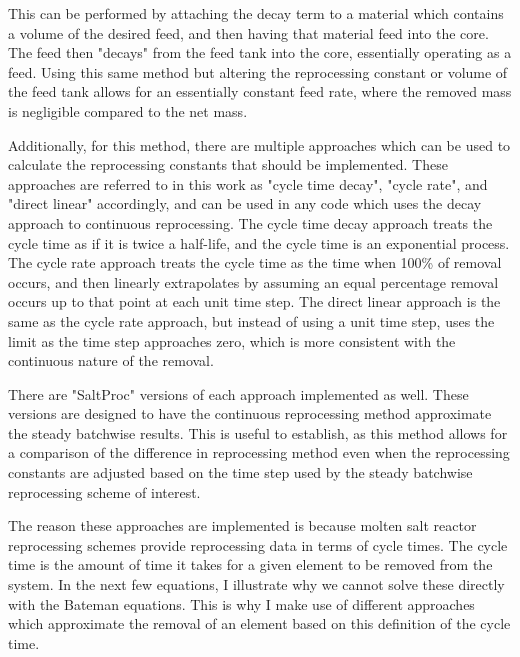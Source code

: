 This can be performed by attaching the decay term to a material which contains a volume of the desired feed, and then having that material feed into the core. The feed then "decays" from the feed tank into the core, essentially operating as a feed. Using this same method but altering the reprocessing constant or volume of the feed tank allows for an essentially constant feed rate, where the removed mass is negligible compared to the net mass.

Additionally, for this method, there are multiple approaches which can be used to calculate the reprocessing constants that should be implemented. These approaches are referred to in this work as "cycle time decay", "cycle rate", and "direct linear" accordingly, and can be used in any code which uses the decay approach to continuous reprocessing. The cycle time decay approach treats the cycle time as if it is twice a half-life, and the cycle time is an exponential process. The cycle rate approach treats the cycle time as the time when 100\% of removal occurs, and then linearly extrapolates by assuming an equal percentage removal occurs up to that point at each unit time step. The direct linear approach is the same as the cycle rate approach, but instead of using a unit time step, uses the limit as the time step approaches zero, which is more consistent with the continuous nature of the removal.

There are "SaltProc" versions of each approach implemented as well. These versions are designed to have the continuous reprocessing method approximate the steady batchwise results. This is useful to establish, as this method allows for a comparison of the difference in reprocessing method even when the reprocessing constants are adjusted based on the time step used by the steady batchwise reprocessing scheme of interest.

The reason these approaches are implemented is because molten salt reactor reprocessing schemes provide reprocessing data in terms of cycle times. The cycle time is the amount of time it takes for a given element to be removed from the system.
In the next few equations, I illustrate why we cannot solve these directly with the Bateman equations. This is why I make use of different approaches which approximate the removal of an element based on this definition of the cycle time.

